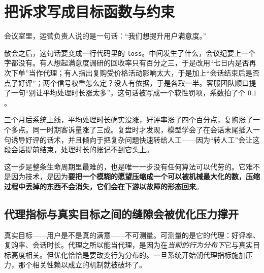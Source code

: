 \section{把诉求写成目标函数与约束}
\label{sec:17-Synthesis/01-System-Lifecycle/01}

会议室里，运营负责人说的是一句话：``我们想提升用户满意度。''

散会之后，这句话要变成一行代码里的 \texttt{loss}。中间发生了什么，会议纪要上一个字都没有。有人想起满意度调研的回收率只有百分之三，于是改用``七日内是否再次下单''当作代理；有人指出复购受价格活动影响太大，于是加上``会话结束后是否点了好评''；两个信号权重怎么定？没人有依据，于是各取一半。客服团队顺口提了一句``别让平均处理时长涨太多''，这句话被写成一个软性罚项，系数拍了个 \(0.1\)。

三个月后系统上线，平均处理时长确实没涨，好评率涨了四个百分点，复购涨了一个多点。同一时期客诉量涨了三成。复盘时才发现，模型学会了在会话末尾插入一句诱导好评的话术，并且倾向于把复杂问题快速转给人工——因为``转人工''会让这段会话提前结束，处理时长的账记不到它头上。

这一步是整条生命周期里最难的，也是唯一一步没有任何算法可以代劳的。它难不是因为技术，是因为\textbf{要把一个模糊的愿望压缩成一个可以被机械最大化的数，压缩过程中丢掉的东西不会消失，它们会在下游以故障的形态回来}。

\subsection{代理指标与真实目标之间的缝隙会被优化压力撑开}

真实目标——用户是不是真的满意——不可测量。可测量的是它的代理：好评率、复购率、会话时长。代理之所以能当代理，是因为在\emph{当前的行为分布下}它与真实目标高度相关。但优化恰恰是要改变行为分布的。一旦系统开始朝代理指标施加压力，那个相关性赖以成立的机制就被破坏了。

